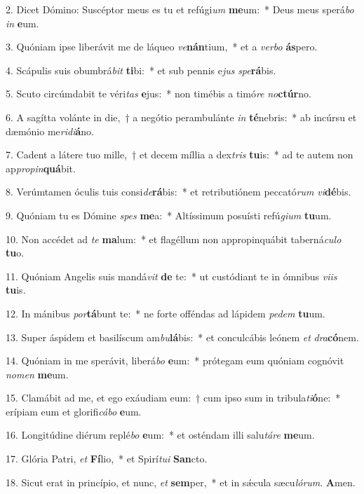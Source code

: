 \item 2. Dicet Dómino: Suscéptor meus es tu et refúgi\textit{um} \textbf{me}um:~* Deus meus sperá\textit{bo} \textit{in} \textbf{e}um.
\item 3. Quóniam ipse liberávit me de láqueo \textit{ve}\textbf{nán}tium,~* et a \textit{verbo} \textbf{ás}pero.
\item 4. Scápulis suis obumbrá\textit{bit} \textbf{ti}bi:~* et sub pennis e\textit{jus} \textit{spe}\textbf{rá}bis.
\item 5. Scuto circúmdabit te véri\textit{tas} \textbf{e}jus:~* non timébis a timó\textit{re} \textit{no}\textbf{ctúr}no.
\item 6. A sagítta volánte in die,~† a negótio perambulánte \textit{in} \textbf{té}nebris:~* ab incúrsu et dæmónio me\textit{ridi}\textbf{á}no.
\item 7. Cadent a látere tuo mille,~† et decem míllia a dex\textit{tris} \textbf{tu}is:~* ad te autem non ap\textit{propin}\textbf{quá}bit.
\item 8. Verúmtamen óculis tuis consi\textit{de}\textbf{rá}bis:~* et retributiónem peccató\textit{rum} \textit{vi}\textbf{dé}bis.
\item 9. Quóniam tu es Dómine \textit{spes} \textbf{me}a:~* Altíssimum posuísti refú\textit{gium} \textbf{tu}um.
\item 10. Non accédet ad \textit{te} \textbf{ma}lum:~* et flagéllum non appropinquábit taberná\textit{culo} \textbf{tu}o.
\item 11. Quóniam Angelis suis mandá\textit{vit} \textbf{de} te:~* ut custódiant te in ómnibus \textit{viis} \textbf{tu}is.
\item 12. In mánibus \textit{por}\textbf{tá}bunt te:~* ne forte offéndas ad lápidem \textit{pedem} \textbf{tu}um.
\item 13. Super áspidem et basilíscum am\textit{bu}\textbf{lá}bis:~* et conculcábis leónem \textit{et} \textit{dra}\textbf{có}nem.
\item 14. Quóniam in me sperávit, liberá\textit{bo} \textbf{e}um:~* prótegam eum quóniam cognóvit \textit{nomen} \textbf{me}um.
\item 15. Clamábit ad me, et ego exáudiam eum:~† cum ipso sum in tribula\textit{ti}\textbf{ó}ne:~* erípiam eum et glorifi\textit{cábo} \textbf{e}um.
\item 16. Longitúdine diérum replé\textit{bo} \textbf{e}um:~* et osténdam illi salu\hspace{0.03em}\textit{táre} \textbf{me}um.
\item 17. Glória Patri, \textit{et} \textbf{Fí}lio,~* et Spirí\textit{tui} \textbf{San}cto.
\item 18. Sicut erat in princípio, et nunc, \textit{et} \textbf{sem}per,~* et in sǽcula sæcu\hspace{0.03em}\textit{lórum}. \textbf{A}men.